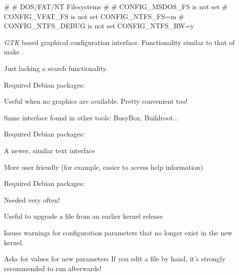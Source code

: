 #
# DOS/FAT/NT Filesystems
#
# CONFIG_MSDOS_FS is not set
# CONFIG_VFAT_FS is not set
CONFIG_NTFS_FS=m
# CONFIG_NTFS_DEBUG is not set
CONFIG_NTFS_RW=y
\stoptyping

    \startitemize
      \item {\em GTK} based graphical configuration interface. Functionality
            similar to that of make .
      \item Just lacking a search functionality.
      \item Required Debian packages: 
    \stopitemize



    \startitemize
      \item Useful when no graphics are available. Pretty convenient too!
      \item Same interface found in other tools: BusyBox, Buildroot...
      \item Required Debian packages: 
    \stopitemize


    \startitemize
      \item A newer, similar text interface
      \item More user friendly (for example, easier to access help information).
      \item Required Debian packages: 
    \stopitemize

  \startitemize
  \item Needed very often!
  \item Useful to upgrade a  file from an earlier kernel release
  \item Issues warnings for configuration parameters that no longer
    exist in the new kernel.
  \item Asks for values for new parameters
  \stopitemize
  If you edit a  file by hand, it's strongly recommended
  to run  afterwards!

